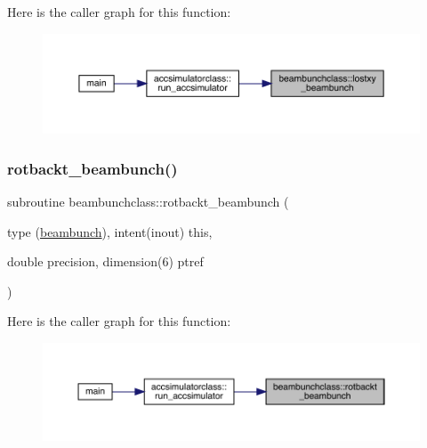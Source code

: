 Here is the caller graph for this function\+:\nopagebreak
\begin{figure}[H]
\begin{center}
\leavevmode
\includegraphics[width=350pt]{namespacebeambunchclass_a68be93e06f8b6c65ee45af2e08610396_icgraph}
\end{center}
\end{figure}
\mbox{\label{namespacebeambunchclass_a26facece08e7014e20db987d5df33c42}} 
\subsubsection{\texorpdfstring{rotbackt\_beambunch()}{rotbackt\_beambunch()}}
{\footnotesize\ttfamily subroutine beambunchclass\+::rotbackt\+\_\+beambunch (\begin{DoxyParamCaption}\item[{type (\mbox{\hyperlink{namespacebeambunchclass_structbeambunchclass_1_1beambunch}{beambunch}}), intent(inout)}]{this,  }\item[{double precision, dimension(6)}]{ptref }\end{DoxyParamCaption})}

Here is the caller graph for this function\+:\nopagebreak
\begin{figure}[H]
\begin{center}
\leavevmode
\includegraphics[width=350pt]{namespacebeambunchclass_a26facece08e7014e20db987d5df33c42_icgraph}
\end{center}
\end{figure}
\mbox{\label{namespacebeambunchclass_a6708b67cc6ed6cbdbba8340d6512ab4f}} 
